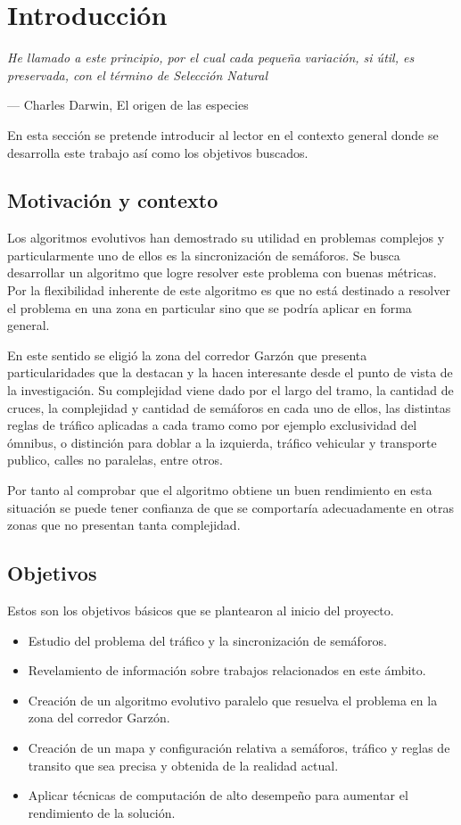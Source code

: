 \chapter{Introducción}
\epigraph{ \textit{He llamado a este principio, por el cual cada pequeña variación, si útil, es preservada, con el término de Selección Natural}}{--- Charles Darwin, El origen de las especies}

En esta sección se pretende introducir al lector en el contexto general donde se desarrolla este trabajo así como los objetivos buscados.

\section{Motivación y contexto}

Los algoritmos evolutivos han demostrado su utilidad en problemas complejos y particularmente uno de ellos es la sincronización de semáforos. Se busca desarrollar un algoritmo que logre resolver este problema con buenas métricas.
Por la flexibilidad inherente de este algoritmo es que no está destinado a resolver el problema en una zona en particular sino que se podría aplicar en forma general.

En este sentido se eligió la zona del corredor Garzón que presenta particularidades que la destacan y la hacen interesante desde el punto de vista de la investigación. Su complejidad viene dado por el largo del tramo, la cantidad de cruces, la complejidad y cantidad de semáforos en cada uno de ellos, las distintas reglas de tráfico aplicadas a cada tramo como por ejemplo exclusividad del ómnibus, o distinción para doblar a la izquierda, tráfico vehicular y transporte publico, calles no paralelas, entre otros.

Por tanto al comprobar que el algoritmo obtiene un buen rendimiento en esta situación se puede tener confianza de que se comportaría adecuadamente en otras zonas que no presentan tanta complejidad.



\newpage

\section{Objetivos}

Estos son los objetivos básicos que se plantearon al inicio del  proyecto.

\begin{itemize}
	\item Estudio del problema del tráfico y la sincronización de semáforos.
	\item Revelamiento de información sobre trabajos relacionados en este ámbito.
	\item Creación de un algoritmo evolutivo paralelo que resuelva el problema en la zona del corredor Garzón.
	\item Creación de un mapa y  configuración relativa a semáforos, tráfico y reglas de transito que sea precisa y obtenida de la realidad actual.	
	\item Aplicar técnicas de computación de alto desempeño para aumentar el rendimiento de la solución.

\end{itemize}

